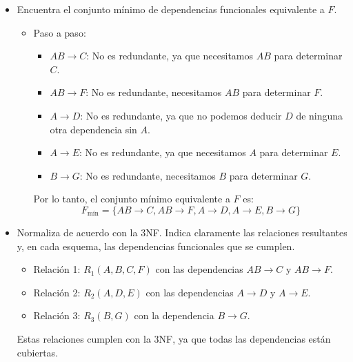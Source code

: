 \begin{itemize}
	\item Encuentra el conjunto mínimo de dependencias funcionales equivalente a \( F \).
	\begin{itemize}
		\item Paso a paso:
		\begin{itemize}
			\item \( AB \rightarrow C \): No es redundante, ya que necesitamos \( AB \) para determinar \( C \).
			\item \( AB \rightarrow F \): No es redundante, necesitamos \( AB \) para determinar \( F \).
			\item \( A \rightarrow D \): No es redundante, ya que no podemos deducir \( D \) de ninguna otra dependencia sin \( A \).
			\item \( A \rightarrow E \): No es redundante, ya que necesitamos \( A \) para determinar \( E \).
			\item \( B \rightarrow G \): No es redundante, necesitamos \( B \) para determinar \( G \).
		\end{itemize}
		Por lo tanto, el conjunto mínimo equivalente a \( F \) es:
		\[
		F_{\text{mín}} = \{ AB \rightarrow C, AB \rightarrow F, A \rightarrow D, A \rightarrow E, B \rightarrow G \}
		\]
	\end{itemize}
	\vspace*{.3cm}
	
	\item Normaliza de acuerdo con la 3NF. Indica claramente las relaciones resultantes y, en cada esquema, las dependencias funcionales que se cumplen.
	\begin{itemize}
		\item Relación 1: \( R_1(A, B, C, F) \) con las dependencias \( AB \rightarrow C \) y \( AB \rightarrow F \).
		\item Relación 2: \( R_2(A, D, E) \) con las dependencias \( A \rightarrow D \) y \( A \rightarrow E \).
		\item Relación 3: \( R_3(B, G) \) con la dependencia \( B \rightarrow G \).
	\end{itemize}
	Estas relaciones cumplen con la 3NF, ya que todas las dependencias están cubiertas.
\end{itemize}
\vspace*{.3cm}

